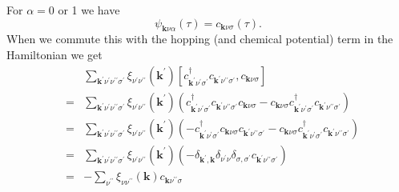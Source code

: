 For $\alpha = 0$ or 1 we have
\begin{equation}
\psi_{\mathbf{k}\nu\alpha}(\tau) = c_{\mathbf{k}\nu\sigma}(\tau).
\end{equation}
When we commute this with the hopping (and chemical potential) term in the
Hamiltonian we get
\begin{eqnarray}
& & 
\sum_{\mathbf{k}^{\prime}\nu^{\prime}\nu^{\prime\prime}\sigma^{\prime}} 
\xi_{\nu^{\prime}\nu^{\prime\prime}}(\mathbf{k}^{\prime})
\left[c^{\dagger}_{\mathbf{k}^{\prime}\nu^{\prime}\sigma^{\prime}}
c_{\mathbf{k}^{\prime}\nu^{\prime\prime}\sigma^{\prime}},
c_{\mathbf{k}\nu\sigma} \right] \\
& = & 
\sum_{\mathbf{k}^{\prime}\nu^{\prime}\nu^{\prime\prime}\sigma^{\prime}} 
\xi_{\nu^{\prime}\nu^{\prime\prime}}(\mathbf{k}^{\prime})
\left(c^{\dagger}_{\mathbf{k}^{\prime}\nu^{\prime}\sigma^{\prime}}
c_{\mathbf{k}^{\prime}\nu^{\prime\prime}\sigma^{\prime}}
c_{\mathbf{k}\nu\sigma} -
c_{\mathbf{k}\nu\sigma}
c^{\dagger}_{\mathbf{k}^{\prime}\nu^{\prime}\sigma^{\prime}}
c_{\mathbf{k}^{\prime}\nu^{\prime\prime}\sigma^{\prime}} \right)
\\
& = & 
\sum_{\mathbf{k}^{\prime}\nu^{\prime}\nu^{\prime\prime}\sigma^{\prime}} 
\xi_{\nu^{\prime}\nu^{\prime\prime}}(\mathbf{k}^{\prime})
\left(-c^{\dagger}_{\mathbf{k}^{\prime}\nu^{\prime}\sigma^{\prime}}
c_{\mathbf{k}\nu\sigma}
c_{\mathbf{k}^{\prime}\nu^{\prime\prime}\sigma^{\prime}} -
c_{\mathbf{k}\nu\sigma}
c^{\dagger}_{\mathbf{k}^{\prime}\nu^{\prime}\sigma^{\prime}}
c_{\mathbf{k}^{\prime}\nu^{\prime\prime}\sigma^{\prime}}
 \right) \\
& = & \sum_{\mathbf{k}^{\prime}\nu^{\prime}\nu^{\prime\prime}\sigma^{\prime}} 
\xi_{\nu^{\prime}\nu^{\prime\prime}}(\mathbf{k}^{\prime})
\left(-\delta_{\mathbf{k}^{\prime},\mathbf{k}}\delta_{\nu^{\prime}\nu}
\delta_{\sigma,\sigma^{\prime}}c_{\mathbf{k}^{\prime}\nu^{\prime\prime}\sigma^{\prime}}
\right) 
\\
& = & - \sum_{\nu^{\prime\prime}}\xi_{\nu\nu^{\prime\prime}}(\mathbf{k}) 
c_{\mathbf{k}\nu^{\prime\prime}\sigma}
\end{eqnarray}

